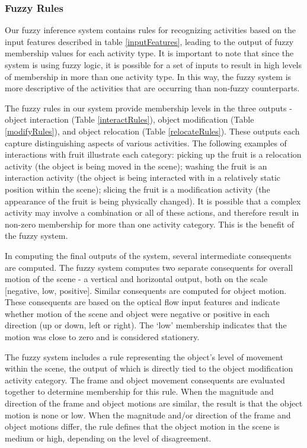 \documentclass[12pt]{report}
\begin{document}
\subsubsection{Fuzzy Rules}
Our fuzzy inference system contains rules for recognizing activities based on the input features described in table \ref{inputFeatures}, leading to the output of fuzzy membership values for each activity type. It is important to note that since the system is using fuzzy logic, it is possible for a set of inputs to result in high levels of membership in more than one activity type. In this way, the fuzzy system is more descriptive of the activities that are occurring than non-fuzzy counterparts.

The fuzzy rules in our system provide membership levels in the three outputs - object interaction (Table \ref{interactRules}), object modification (Table \ref{modifyRules}), and object relocation (Table \ref{relocateRules}). These outputs each capture distinguishing aspects of various activities. The following examples of interactions with fruit illustrate each category: picking up the fruit is a relocation activity (the object is being moved in the scene); washing the fruit is an interaction activity (the object is being interacted with in a relatively static position within the scene); slicing the fruit is a modification activity (the appearance of the fruit is being physically changed). It is possible that a complex activity may involve a combination or all of these actions, and therefore result in non-zero membership for more than one activity category. This is the benefit of the fuzzy system.

In computing the final outputs of the system, several intermediate consequents are computed. The fuzzy system computes two separate consequents for overall motion of the scene - a vertical and horizontal output, both on the scale [negative, low, positive]. Similar consequents are computed for object motion. These consequents are based on the optical flow input features and indicate whether motion of the scene and object were negative or positive in each direction (up or down, left or right). The ‘low’ membership indicates that the motion was close to zero and is considered stationery.

The fuzzy system includes a rule representing the object’s level of movement within the scene, the output of which is directly tied to the object modification activity category. The frame and object movement consequents are evaluated together to determine membership for this rule. When the magnitude and direction of the frame and object motions are similar, the result is that the object motion is none or low. When the magnitude and/or direction of the frame and object motions differ, the rule defines that the object motion in the scene is medium or high, depending on the level of disagreement.
\end{document}
